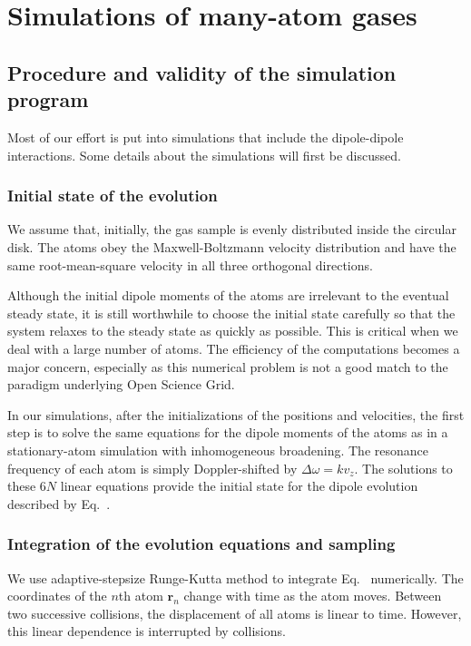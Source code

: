 \section{Simulations of many-atom gases}
\subsection{Procedure and validity of the simulation program}

Most of our effort is put into simulations that include the dipole-dipole interactions. Some details about the simulations will first be discussed. 

\subsubsection{Initial state of the evolution}

We assume that, initially, the gas sample is evenly distributed inside the circular disk. The atoms obey the Maxwell-Boltzmann velocity distribution and have the same root-mean-square velocity in all three orthogonal directions.

Although the initial dipole moments of the atoms are irrelevant to the eventual steady state, it is still worthwhile to choose the initial state carefully so that the system relaxes to the steady state as quickly as possible. This is critical when we deal with a large number of atoms. The efficiency of the computations becomes a major concern, especially as this numerical problem is not a good match to the paradigm underlying Open Science Grid.

In our simulations, after the initializations of the positions and velocities, the first step is to solve the same equations for the dipole moments of the atoms as in a stationary-atom simulation with inhomogeneous broadening. The resonance frequency of each atom is simply Doppler-shifted by $\Delta\omega=kv_z$. The solutions to these $6N$ linear equations provide the initial state for the dipole evolution described by Eq.~.

\subsubsection{Integration of the evolution equations and sampling}

We use adaptive-stepsize Runge-Kutta method to integrate Eq.~ numerically. The coordinates of the $n$th atom $\mathbf{r}_n$ change with time as the atom moves. Between two successive collisions, the displacement of all atoms is linear to time. However, this linear dependence is interrupted by collisions.


